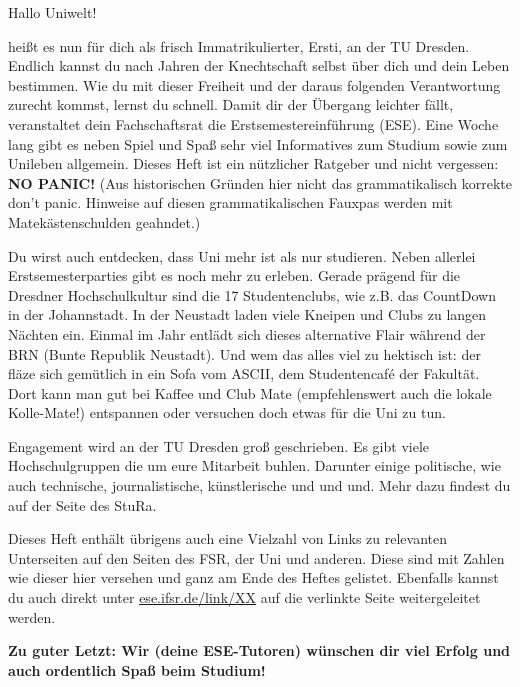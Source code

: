 
Hallo Uniwelt!

heißt es nun für dich als frisch Immatrikulierter, Ersti, an der TU Dresden. 
Endlich kannst du nach Jahren der Knechtschaft selbst über dich und dein Leben bestimmen. 
Wie du mit dieser Freiheit und der daraus folgenden Verantwortung zurecht kommst, lernst du schnell. 
Damit dir der Übergang leichter fällt, veranstaltet dein Fachschaftsrat die Erstsemestereinführung (ESE). 
Eine Woche lang gibt es neben Spiel und Spaß sehr viel Informatives zum Studium sowie zum Unileben allgemein. 
Dieses Heft ist ein nützlicher Ratgeber und nicht vergessen: 
\textbf{NO PANIC!} (Aus historischen Gründen hier nicht das grammatikalisch korrekte \glqq don't panic\grqq. Hinweise auf diesen grammatikalischen Fauxpas werden mit Matekästenschulden geahndet.)

Du wirst auch entdecken, dass Uni mehr ist als nur studieren. 
Neben allerlei Erstsemesterparties gibt es noch mehr zu erleben. 
Gerade prägend für die Dresdner Hochschulkultur sind die 17 Studentenclubs, wie z.B. das CountDown in der Johannstadt. 
In der Neustadt laden viele Kneipen und Clubs zu langen Nächten ein. 
Einmal im Jahr entlädt sich dieses alternative Flair während der BRN (Bunte Republik Neustadt). 
Und wem das alles viel zu hektisch ist: der fläze sich gemütlich in ein Sofa vom ASCII, dem Studentencafé der Fakultät. 
Dort kann man gut bei Kaffee und Club Mate (empfehlenswert auch die lokale Kolle-Mate!) entspannen oder versuchen doch etwas für die Uni zu tun.

Engagement wird an der TU Dresden groß geschrieben. 
Es gibt viele Hochschulgruppen die um eure Mitarbeit buhlen. 
Darunter einige politische, wie auch technische, journalistische, künstlerische und und und. Mehr dazu findest du auf der Seite des StuRa.

Dieses Heft enthält übrigens auch eine Vielzahl von Links zu relevanten Unterseiten auf den Seiten des FSR, der Uni und anderen. 
Diese sind mit Zahlen wie dieser hier  versehen und ganz am Ende des Heftes gelistet. Ebenfalls kannst du auch direkt unter \url{ese.ifsr.de/link/XX} auf die verlinkte Seite weitergeleitet werden.

\textbf{Zu guter Letzt: Wir (deine ESE-Tutoren) wünschen dir viel Erfolg und auch ordentlich Spaß beim Studium!}

